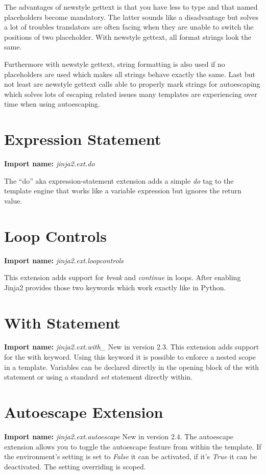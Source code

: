 \documentclass[a4paper,10pt,english]{sphinxmanual}
\begin{document}
The advantages of newstyle gettext is that you have less to type and that
named placeholders become mandatory.  The latter sounds like a
disadvantage but solves a lot of troubles translators are often facing
when they are unable to switch the positions of two placeholder.  With
newstyle gettext, all format strings look the same.

Furthermore with newstyle gettext, string formatting is also used if no
placeholders are used which makes all strings behave exactly the same.
Last but not least are newstyle gettext calls able to properly mark
strings for autoescaping which solves lots of escaping related issues many
templates are experiencing over time when using autoescaping.


\section{Expression Statement}
\label{extensions:expression-statement}
\textbf{Import name:} \emph{jinja2.ext.do}

The ``do'' aka expression-statement extension adds a simple \emph{do} tag to the
template engine that works like a variable expression but ignores the
return value.


\section{Loop Controls}
\label{extensions:loop-controls}\label{extensions:loopcontrols-extension}
\textbf{Import name:} \emph{jinja2.ext.loopcontrols}

This extension adds support for \emph{break} and \emph{continue} in loops.  After
enabling Jinja2 provides those two keywords which work exactly like in
Python.


\section{With Statement}
\label{extensions:with-statement}\label{extensions:with-extension}
\textbf{Import name:} \emph{jinja2.ext.with\_}
New in version 2.3.
This extension adds support for the with keyword.  Using this keyword it
is possible to enforce a nested scope in a template.  Variables can be
declared directly in the opening block of the with statement or using a
standard \emph{set} statement directly within.


\section{Autoescape Extension}
\label{extensions:autoescape-extension}\label{extensions:id3}
\textbf{Import name:} \emph{jinja2.ext.autoescape}
New in version 2.4.
The autoescape extension allows you to toggle the autoescape feature from
within the template.  If the environment's 
setting is set to \emph{False} it can be activated, if it's \emph{True} it can be
deactivated.  The setting overriding is scoped.
\end{document}
